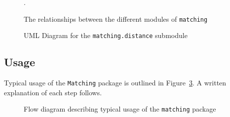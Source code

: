 \documentclass[11pt]{extarticle}
\begin{document}
\begin{figure}[h!]
  \caption{\label{fig:arch_flow} The relationships between the different modules of \texttt{matching}}.
\end{figure}
\begin{figure}[h!]
  \caption{\label{fig:distance_uml} UML Diagram for the \texttt{matching.distance} submodule}
\end{figure}

\newpage
\subsection{Usage}
\label{subsec:usage}

Typical usage of the \texttt{Matching} package is outlined in Figure~\ref{fig:matching_usage}. A written explanation of each step follows.

\begin{figure}[h!]
  \caption{\label{fig:matching_usage} Flow diagram describing typical usage of the \texttt{matching} package}
\end{figure}
\end{document}
